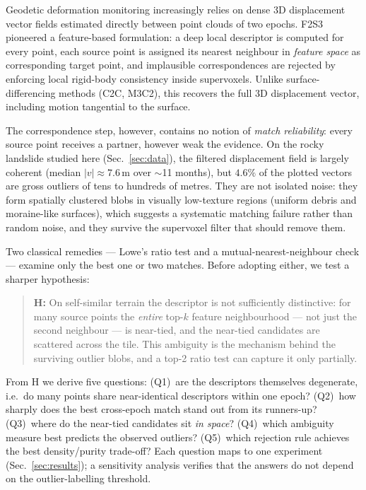 \documentclass[11pt,a4paper]{article}
\newcommand{\vv}{\lvert v\rvert}
\begin{document}
Geodetic deformation monitoring increasingly relies on dense 3D displacement
vector fields estimated directly between point clouds of two epochs. F2S3
\cite{gojcic2020} pioneered a feature-based formulation: a deep local
descriptor is computed for every point, each source point is assigned its
nearest neighbour in \emph{feature space} as corresponding target point, and
implausible correspondences are rejected by enforcing local rigid-body
consistency inside supervoxels. Unlike surface-differencing methods (C2C,
M3C2), this recovers the full 3D displacement vector, including motion
tangential to the surface.

The correspondence step, however, contains no notion of \emph{match
reliability}: every source point receives a partner, however weak the
evidence. On the rocky landslide studied here (Sec.~\ref{sec:data}), the
filtered displacement field is largely coherent (median
$\vv\approx7.6$\,m over $\sim$11 months), but $4.6\%$ of the plotted vectors
are gross outliers of tens to hundreds of metres. They are not isolated
noise: they form spatially clustered blobs in visually low-texture regions
(uniform debris and moraine-like surfaces), which suggests a systematic
matching failure rather than random noise, and they survive the supervoxel
filter that should remove them.

Two classical remedies --- Lowe's ratio test \cite{lowe2004} and a
mutual-nearest-neighbour check --- examine only the best one or two matches.
Before adopting either, we test a sharper hypothesis:

\begin{quote}
\textbf{H:} On self-similar terrain the descriptor is not sufficiently
distinctive: for many source points the \emph{entire} top-$k$ feature
neighbourhood --- not just the second neighbour --- is near-tied, and the
near-tied candidates are scattered across the tile. This ambiguity is the
mechanism behind the surviving outlier blobs, and a top-2 ratio test can
capture it only partially.
\end{quote}

From H we derive five questions: (Q1)~are the descriptors themselves
degenerate, i.e.\ do many points share near-identical descriptors within one
epoch? (Q2)~how sharply does the best cross-epoch match stand out from its
runners-up? (Q3)~where do the near-tied candidates sit \emph{in space}?
(Q4)~which ambiguity measure best predicts the observed outliers? (Q5)~which
rejection rule achieves the best density/purity trade-off? Each question
maps to one experiment (Sec.~\ref{sec:results}); a sensitivity analysis
verifies that the answers do not depend on the outlier-labelling threshold.
\end{document}
